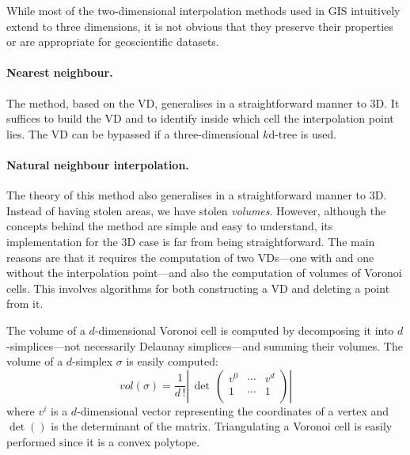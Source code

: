 While most of the two-dimensional interpolation methods used in GIS intuitively extend to three dimensions, it is not obvious that they preserve their properties or are appropriate for geoscientific datasets.

\paragraph{Nearest neighbour.} 
The method, based on the VD, generalises in a straightforward manner to 3D.
It suffices to build the VD and to identify inside which cell the interpolation point lies.
The VD can be bypassed if a three-dimensional $k$d-tree is used.

\paragraph{Natural neighbour interpolation.}
The theory of this method also generalises in a straightforward manner to 3D.
Instead of having stolen areas, we have stolen \emph{volumes}.
However, although the concepts behind the method are simple and easy to understand, its implementation for the 3D case is far from being straightforward. 
The main reasons are that it requires the computation of two VDs---one with and one without the interpolation point---and also the computation of volumes of Voronoi cells. 
This involves algorithms for both constructing a VD and deleting a point from it.

The volume of a $d$-dimensional Voronoi cell is computed by decomposing it into $d$-simplices---not necessarily Delaunay simplices---and summing their volumes. 
The volume of a $d$-simplex $\sigma$ is easily computed:
\begin{equation}
vol(\sigma) = \frac{1}{d \, !} \left| \,  
                            \det \, \left( 
                                  \begin{array}{ccc}
                                    v^{0} & \cdots & v^{d} \\
                                    1     & \cdots & 1 \\
                                  \end{array}
                                \right)
                        \right|
\end{equation}  
where $v^{i}$ is a $d$-dimensional vector representing the coordinates of a vertex and $\det()$ is the determinant of the matrix. 
Triangulating a Voronoi cell is easily performed since it is a convex polytope.


